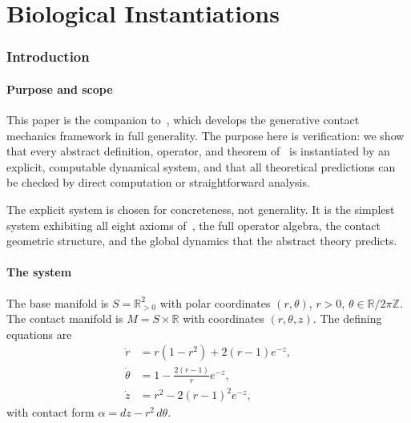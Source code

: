 \documentclass[12pt, oneside]{book}
\theoremstyle{plain}
\theoremstyle{definition}
\theoremstyle{remark}
\newcommand{\R}{\mathbb{R}}
\begin{document}
\part{Biological Instantiations}


\section{Introduction}\label{sec:intro}

\subsection{Purpose and scope}

This paper is the companion to~\cite{Paper1}, which develops the
generative contact mechanics framework in full generality. The purpose
here is verification: we show that every abstract definition, operator,
and theorem of~\cite{Paper1} is instantiated by an explicit, computable
dynamical system, and that all theoretical predictions can be checked
by direct computation or straightforward analysis.

The explicit system is chosen for concreteness, not generality.
It is the simplest system exhibiting all eight axioms of~\cite{Paper1},
the full operator algebra, the contact geometric structure, and the
global dynamics that the abstract theory predicts.

\subsection{The system}

The base manifold is $S=\R^2_{>0}$ with polar coordinates $(r,\theta)$,
$r>0$, $\theta\in\R/2\pi\mathbb{Z}$. The contact manifold is
$M=S\times\R$ with coordinates $(r,\theta,z)$. The defining equations are
\begin{align}
  \dot r &= r(1-r^2) + 2(r-1)e^{-z},\label{eq:rdot}\\
  \dot\theta &= 1 - \frac{2(r-1)}{r}e^{-z},\label{eq:thetadot}\\
  \dot z &= r^2 - 2(r-1)^2 e^{-z},\label{eq:zdot}
\end{align}
with contact form $\alpha=dz-r^2\,d\theta$.
\end{document}
